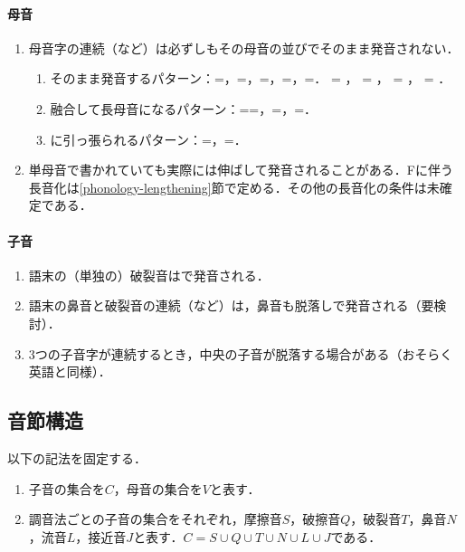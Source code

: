 \documentclass[../../main-detail.tex]{subfiles}
\begin{document}
\paragraph{母音}
\begin{enumerate}
    \item 
母音字の連続（など）は必ずしもその母音の並びでそのまま発音されない．
\begin{enumerate}
    \item そのまま発音するパターン：=\textipa{[ai]}，=\textipa{[ay]}，=\textipa{[a9]}，=\textipa{[oi]}，=\textipa{[o9]}． = \textipa{[ei]}， = \textipa{[ey]}， = \textipa{[Wi]}， = \textipa{[Wy]}．
    \item 融合して長母音になるパターン：==\textipa{[\ae:]}，=\textipa{[\oe:]}，=\textipa{[\o:]}．
    \item {}に引っ張られるパターン：=\textipa{[o:]}，=\textipa{[o:]}．
\end{enumerate}
\item 
単母音で書かれていても実際には伸ばして発音されることがある．Fに伴う長音化は\ref{phonology-lengthening}節で定める．その他の長音化の条件は未確定である．
\end{enumerate}
\paragraph{子音}
\begin{enumerate}
    \item 語末の（単独の）破裂音は\textipa{[P]}で発音される．
    \item 語末の鼻音と破裂音の連続（など）は，鼻音も脱落し\textipa{[P]}で発音される（要検討）．
    \item 3つの子音字が連続するとき，中央の子音が脱落する場合がある（おそらく英語と同様）．
\end{enumerate}

\subsection{音節構造}
以下の記法を固定する．
\begin{enumerate}[label=(\arabic*)]
    \item 子音の集合を$C$，母音の集合を$V$と表す．
    \item 調音法ごとの子音の集合をそれぞれ，摩擦音$S$，破擦音$Q$，破裂音$T$，鼻音$N$，流音$L$，接近音$J$と表す．$C = S\cup Q\cup T\cup N\cup L\cup J$である．
\end{enumerate}
\end{document}
